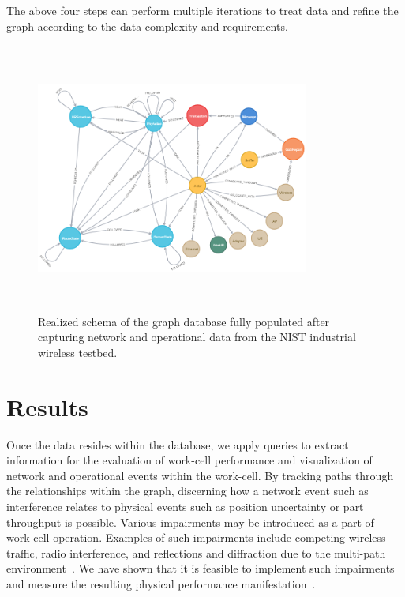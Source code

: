 The above four steps can perform multiple iterations to treat data and refine the graph according to the data complexity and requirements.  
%
\begin{figure}
	\centering
	\includegraphics[width=0.8\textwidth,height=3.5in]{chapter-gdb-appl/figures/database/graph_schema_updated_2.png}
	\caption{Realized schema of the graph database fully populated after capturing network and operational data from the NIST industrial wireless testbed. \vspace{-0.2in}}
	\label{gdbappl:fig:real-schema}
\end{figure}

\section{Results} \label{gdbappl:sec:results}

Once the data resides within the database, we apply queries to extract information for the evaluation of work-cell performance and visualization of network and operational events within the work-cell. By tracking paths through the relationships within the graph, discerning how a network event such as interference relates to physical events such as position uncertainty or part throughput is possible. Various impairments may be introduced as a part of work-cell operation.  Examples of such impairments include competing wireless traffic, radio interference, and reflections and diffraction due to the multi-path environment~\cite{Candell2017.NIST1951}. We have shown that it is feasible to implement such impairments and measure the resulting physical performance manifestation~\cite{Liu2019vancouver}. 


